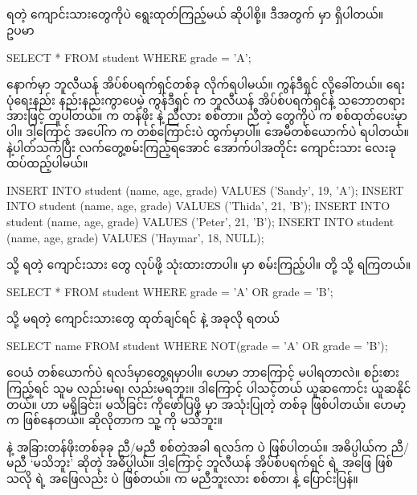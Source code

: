 \subsection*{}
 ရတဲ့ ကျောင်းသားတွေကိုပဲ ရွေးထုတ်ကြည့်မယ် ဆိုပါစို့။ ဒီအတွက်  မှာ  ရှိပါတယ်။ ဥပမာ
%
\begin{sql}
SELECT * FROM student WHERE grade = 'A';
\end{sql}
%
 နောက်မှာ ဘူလီယန် အိပ်စ်ပရက်ရှင်တစ်ခု လိုက်ရပါမယ်။  ကွန်ဒီရှင်  လို့ခေါ်တယ်။ ရေးပုံရေးနည်း နည်းနည်းကွာပေမဲ့   ကွန်ဒီရှင် က  ဘူလီယန် အိပ်စ်ပရက်ရှင်နဲ့ သဘောတရားအားဖြင့် တူပါတယ်။  က   တန်ဖိုး  နဲ့ ညီလား စစ်တာ။ ညီတဲ့  တွေကိုပဲ  က စစ်ထုတ်ပေးမှာပါ။ ဒါ့ကြောင့် အပေါ်က  က  တစ်ကြောင်းပဲ ထွက်မှာပါ။ အေမီတစ်ယောက်ပဲ  ရပါတယ်။  နဲ့ပါတ်သက်ပြီး လက်တွေ့စမ်းကြည့်ရအောင် အောက်ပါအတိုင်း ကျောင်းသား  လေးခု ထပ်ထည့်ပါမယ်။  
%
\begin{sql}
INSERT INTO student (name, age, grade) VALUES ('Sandy', 19, 'A');
INSERT INTO student (name, age, grade) VALUES ('Thida', 21, 'B');
INSERT INTO student (name, age, grade) VALUES ('Peter', 21, 'B');
INSERT INTO student (name, age, grade) VALUES ('Haymar', 18, NULL);
\end{sql}
%

 သို့  ရတဲ့ ကျောင်းသား  တွေ  လုပ်ဖို့  သုံးထားတာပါ။  မှာ စမ်းကြည့်ပါ။  တို့  သို့  ရကြတယ်။
%
\begin{sql}
SELECT * FROM student WHERE grade = 'A' OR grade = 'B';
\end{sql}
 သို့  မရတဲ့ ကျောင်းသားတွေ ထုတ်ချင်ရင်  နဲ့ အခုလို ရတယ်
%
\begin{sql}
SELECT name FROM student WHERE NOT(grade = 'A' OR grade = 'B');
\end{sql}
ဝေယံ တစ်ယောက်ပဲ ရလဒ်မှာတွေ့ရမှာပါ။ ဟေမာ ဘာကြောင့် မပါရတာလဲ။ စဉ်းစားကြည့်ရင် သူမ  လည်းမရ၊   လည်းမရဘူး။ ဒါကြောင့်  ပါသင့်တယ် ယူဆကောင်း ယူဆနိုင်တယ်။  ဟာ မရှိခြင်း၊ မသိခြင်း ကိုဖော်ပြဖို့  မှာ အသုံးပြုတဲ့  တစ်ခု ဖြစ်ပါတယ်။ ဟေမာ့  က  ဖြစ်နေတယ်။ ဆိုလိုတာက သူ့  ကို မသိဘူး။ 

 နဲ့ အခြားတန်ဖိုးတစ်ခုခု ညီ/မညီ စစ်တဲ့အခါ ရလဒ်က  ပဲ ဖြစ်ပါတယ်။ အဓိပ္ပါယ်က ညီ/မညီ ‘မသိဘူး’ ဆိုတဲ့ အဓိပ္ပါယ်။ ဒါ့ကြောင့် ဘူလီယန် အိပ်စ်ပရက်ရှင်  ရဲ့ အဖြေ  ဖြစ်သလို  ရဲ့ အဖြေလည်း  ပဲ ဖြစ်တယ်။ \fCode{<>} က မညီဘူးလား စစ်တာ၊ \fCode{=} နဲ့ ပြောင်းပြန်။ 


